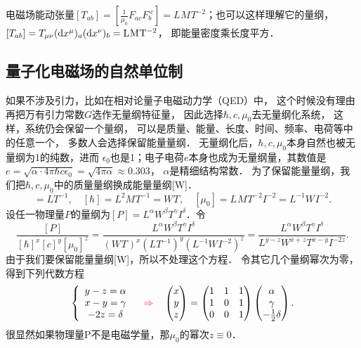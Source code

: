 电磁场能动张量$[T_{ab}]=[\frac{1}{\mu_0} F_{ac} F_{b}^{\cdot c}]
= \si{L^{}M^{}T^{-2}}  $；也可以这样理解它的量纲，
$[T_{ab}]=T_{\mu\nu}({\rm d}x^\mu)_a ({\rm d}x^\nu)_b=\si{L^{}M^{}T^{-2}}$，
即能量密度乘长度平方．


\subsection{量子化电磁场的自然单位制}\label{chunit-dim:sec_qed}
如果不涉及引力，比如在相对论量子电磁动力学（QED）中，
这个时候没有理由再把万有引力常数$G$选作无量纲特征量，
因此选择$\hbar,c,\mu_0$去无量纲化系统，
这样，系统仍会保留一个量纲，
可以是质量、能量、长度、时间、频率、电荷等中的任意一个，
多数人会选择保留能量量纲．
无量纲化后，$\hbar,c,\mu_0$本身自然也被无量纲为1的纯数，进而
$\epsilon_0$也是1；电子电荷$e$本身也成为无量纲量，其数值是
$e=\sqrt{\alpha\cdot 4\pi \hbar c \epsilon_0} =
\sqrt{4\pi\alpha}\approx \num{0.303}$，
$\alpha$是精细结构常数．
为了保留能量量纲，我们把$\hbar,c,\mu_0$中的质量量纲换成能量量纲[\si{W}]．
\begin{equation*}
  [c] = \si{LT^{-1}},\quad  [\hbar] = \si{L^{2}M^{}T^{-1}} = \si{W^{}T^{}}, \quad
  [\mu_0] = \si{L^{}M^{}T^{-2}I^{-2}}= \si{L^{-1}W^{}I^{-2}} .
\end{equation*}
设任一物理量$P$的量纲为$[P]=\si{L}^\alpha \si{W}^\beta \si{T}^\gamma \si{I}^\delta$．令
\begin{equation}\label{chunit-dim:eqn_dimensionless-qed-0}
  \dfrac{[P]}{[\hbar]^x[c]^y[\mu_0]^z}
  = \frac{\si{L}^\alpha \si{W}^\beta \si{T}^\gamma \si{I}^\delta}
    {(\si{W^{}T^{}} )^x (\si{LT^{-1}})^y (\si{L^{-1}W^{}I^{-2}})^z }
  = \frac{\si{L}^\alpha \si{W}^\beta \si{T}^\gamma \si{I}^\delta}
    {\si{L}^{y-z}  \si{W}^{x+z} \si{T}^{x-y} \si{I}^{-2z} } .
\end{equation}
由于我们要保留能量量纲[\si{W}]，所以不处理这个方程．
令其它几个量纲幂次为零，得到下列代数方程
\begin{equation}\label{chunit-dim:eqn_dimensionless-qed-1}
  \left\{ \begin{array}{*{20}{c}}
    {y - z = \alpha } \\
    {x - y = \gamma } \\
    { - 2z = \delta }
    \end{array} \right. \quad {\color{red}\Rightarrow} \quad
    \begin{pmatrix}
      x \\   y \\     z
    \end{pmatrix}  =  \begin{pmatrix}
      1&1&1 \\
      1&0&1 \\
      0&0&1
    \end{pmatrix} \begin{pmatrix}
      \alpha  \\   \gamma  \\    - \frac{1}{2}\delta
    \end{pmatrix}.
\end{equation}
很显然如果物理量\si{P}不是电磁学量，那$\mu_0$的幂次$z\equiv 0$．

